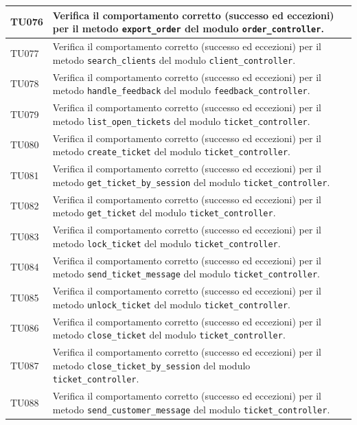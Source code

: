 \documentclass[a4paper,11pt,oneside]{scrartcl}
\begin{document}
\begin{longtable}{|p{1.9cm}|p{11.6cm}|c|}
TU076 & Verifica il comportamento corretto (successo ed eccezioni) per il metodo \texttt{export\_order} del modulo \texttt{order\_controller}. & \\ \hline
TU077 & Verifica il comportamento corretto (successo ed eccezioni) per il metodo \texttt{search\_clients} del modulo \texttt{client\_controller}. & \\ \hline
TU078 & Verifica il comportamento corretto (successo ed eccezioni) per il metodo \texttt{handle\_feedback} del modulo \texttt{feedback\_controller}. & \\ \hline
TU079 & Verifica il comportamento corretto (successo ed eccezioni) per il metodo \texttt{list\_open\_tickets} del modulo \texttt{ticket\_controller}. & \\ \hline
TU080 & Verifica il comportamento corretto (successo ed eccezioni) per il metodo \texttt{create\_ticket} del modulo \texttt{ticket\_controller}. & \\ \hline
TU081 & Verifica il comportamento corretto (successo ed eccezioni) per il metodo \texttt{get\_ticket\_by\_session} del modulo \texttt{ticket\_controller}. & \\ \hline
TU082 & Verifica il comportamento corretto (successo ed eccezioni) per il metodo \texttt{get\_ticket} del modulo \texttt{ticket\_controller}. & \\ \hline
TU083 & Verifica il comportamento corretto (successo ed eccezioni) per il metodo \texttt{lock\_ticket} del modulo \texttt{ticket\_controller}. & \\ \hline
TU084 & Verifica il comportamento corretto (successo ed eccezioni) per il metodo \texttt{send\_ticket\_message} del modulo \texttt{ticket\_controller}. & \\ \hline
TU085 & Verifica il comportamento corretto (successo ed eccezioni) per il metodo \texttt{unlock\_ticket} del modulo \texttt{ticket\_controller}. & \\ \hline
TU086 & Verifica il comportamento corretto (successo ed eccezioni) per il metodo \texttt{close\_ticket} del modulo \texttt{ticket\_controller}. & \\ \hline
TU087 & Verifica il comportamento corretto (successo ed eccezioni) per il metodo \texttt{close\_ticket\_by\_session} del modulo \texttt{ticket\_controller}. & \\ \hline
TU088 & Verifica il comportamento corretto (successo ed eccezioni) per il metodo \texttt{send\_customer\_message} del modulo \texttt{ticket\_controller}. & \\ \hline

\end{longtable}
\end{document}
